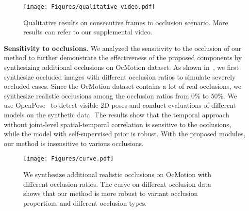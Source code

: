 \begin{figure*}
    \vspace{-6mm}
    \begin{center}
    \texttt{[image: Figures/qualitative\_video.pdf]}
    \end{center}
    \vspace{-8mm}
    \caption{Qualitative results on consecutive frames in occlusion scenario. More results can refer to our supplemental video.}
    \label{fig:qualitative_video}
    \vspace{-8mm}
\end{figure*}



\noindent\textbf{Sensitivity to occlusions.}
We analyzed the sensitivity to the occlusion of our method to further demonstrate the effectiveness of the proposed components by synthesizing additional occlusions on OcMotion dataset. As shown in~, we first synthesize occluded images with different occlusion ratios to simulate severely occluded cases. Since the OcMotion dataset contains a lot of real occlusions, we synthesize realistic occlusions among the occlusion ratios from 0\% to 50\%. We use OpenPose~\cite{cao2017realtime} to detect visible 2D poses and conduct evaluations of different models on the synthetic data. The results show that the temporal approach without joint-level spatial-temporal correlation is sensitive to the occlusions, while the model with self-supervised prior is robust. With the proposed modules, our method is insensitive to various occlusions.

\begin{figure}
    \vspace{-4mm}
    \begin{center}
    \texttt{[image: Figures/curve.pdf]}
    \end{center}
    \vspace{-8mm}
    \caption{We synthesize additional realistic occlusions on OcMotion with different occlusion ratios. The curve on different occlusion data shows that our method is more robust to variant occlusion proportions and different occlusion types.}
    \label{fig:curve}
    \vspace{-6mm}
\end{figure}




